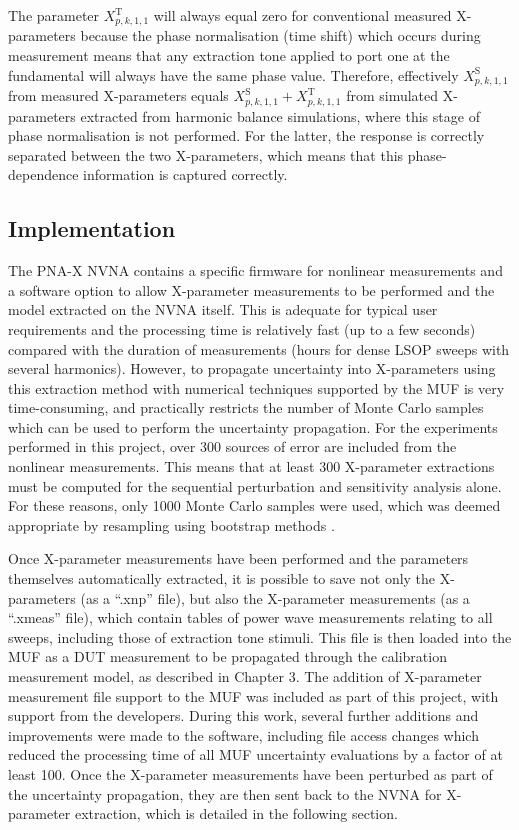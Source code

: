 \documentclass[../thesis/thesis.tex]{subfiles}
\begin{document}
\begin{refsection}
The parameter $X^\textrm{T}_{p,k, 1, 1}$ will always equal zero for conventional measured X-parameters because the phase normalisation (time shift) which occurs during measurement means that any extraction tone applied to port one at the fundamental will always have the same phase value. Therefore, effectively $X^\textrm{S}_{p,k, 1, 1}$ from measured X-parameters equals $X^\textrm{S}_{p,k, 1, 1} + X^\textrm{T}_{p,k, 1, 1}$ from simulated X-parameters extracted from harmonic balance simulations, where this stage of phase normalisation is not performed. For the latter, the response is correctly separated between the two X-parameters, which means that this phase-dependence information is captured correctly. 

\subsection{Implementation}

The PNA-X NVNA contains a specific firmware for nonlinear measurements and a software option to allow X-parameter measurements to be performed and the model extracted on the NVNA itself. This is adequate for typical user requirements and the processing time is relatively fast (up to a few seconds) compared with the duration of measurements (hours for dense LSOP sweeps with several harmonics). However, to propagate uncertainty into X-parameters using this extraction method with numerical techniques supported by the MUF is very time-consuming, and practically restricts the number of Monte Carlo samples which can be used to perform the uncertainty propagation. For the experiments performed in this project, over 300 sources of error are included from the nonlinear measurements. This means that at least 300 X-parameter extractions must be computed for the sequential perturbation and sensitivity analysis alone. For these reasons, only 1000 Monte Carlo samples were used, which was deemed appropriate by resampling using bootstrap methods \cite{Chernick_2008}.

Once X-parameter measurements have been performed and the parameters themselves automatically extracted, it is possible to save not only the X-parameters (as a ``.xnp'' file), but also the X-parameter measurements (as a ``.xmeas'' file), which contain tables of power wave measurements relating to all sweeps, including those of extraction tone stimuli. This file is then loaded into the MUF as a DUT measurement to be propagated through the calibration measurement model, as described in Chapter 3. The addition of X-parameter measurement file support to the MUF was included as part of this project, with support from the developers. During this work, several further additions and improvements were made to the software, including file access changes which reduced the processing time of all MUF uncertainty evaluations by a factor of at least 100. Once the X-parameter measurements have been perturbed as part of the uncertainty propagation, they are then sent back to the NVNA for X-parameter extraction, which is detailed in the following section.


\end{refsection}
\end{document}
